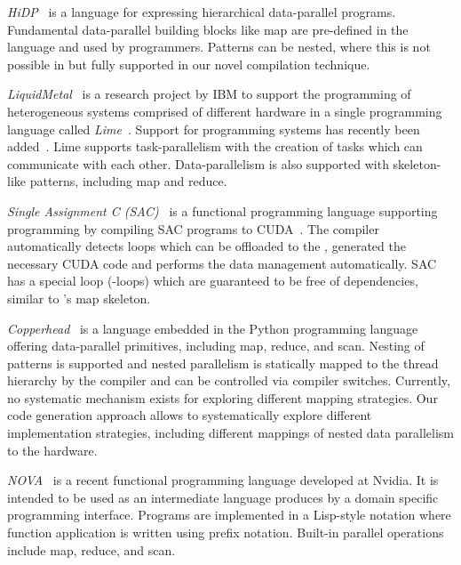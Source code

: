 \bigskip

\emph{HiDP}~\cite{ZhangM13} is a language for expressing hierarchical data-parallel programs.
Fundamental data-parallel building blocks like map are pre-defined in the language and used by programmers.
Patterns can be nested, where this is not possible in \SkelCL but fully supported in our novel compilation technique.

\bigskip

\emph{LiquidMetal}~\cite{HuangHBR08} is a research project by IBM to support the programming of heterogeneous systems comprised of different hardware in a single programming language called \emph{Lime}~\cite{AuerbachBCR10}.
Support for programming \GPU systems has recently been added~\cite{DubachCRBF12}.
Lime supports task-parallelism with the creation of tasks which can communicate with each other.
Data-parallelism is also supported with skeleton-like patterns, including map and reduce.

\bigskip

\emph{Single Assignment C (SAC)}~\cite{GrelckS06} is a functional programming language supporting \GPUs programming by compiling SAC programs to CUDA~\cite{GuoTS11}.
The compiler automatically detects loops which can be offloaded to the \GPU, generated the necessary CUDA code and performs the data management automatically.
SAC has a special loop (-loops) which are guaranteed to be free of dependencies, similar to \SkelCL's map skeleton.

\bigskip

\emph{Copperhead}~\cite{CatanzaroGK11} is a \GPU language embedded in the Python programming language offering data-parallel primitives, including map, reduce, and scan.
Nesting of patterns is supported and nested parallelism is statically mapped to the \GPU thread hierarchy by the compiler and can be controlled via compiler switches.
Currently, no systematic mechanism exists for exploring different mapping strategies.
Our code generation approach allows to systematically explore different implementation strategies, including different mappings of nested data parallelism to the hardware.

\bigskip

\emph{NOVA}~\cite{CollinsGGLS14} is a recent functional \GPU programming language developed at Nvidia.
It is intended to be used as an intermediate language produces by a domain specific programming interface.
Programs are implemented in a Lisp-style notation where function application is written using prefix notation.
Built-in parallel operations include map, reduce, and scan.

